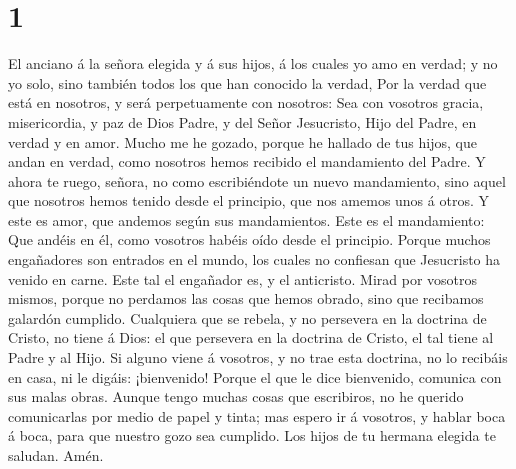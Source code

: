 \hypertarget{section}{%
\section{1}\label{section}}

 El anciano á la señora elegida y á sus hijos, á los
cuales yo amo en verdad; y no yo solo, sino también todos los que han
conocido la verdad,  Por la verdad que está en nosotros, y
será perpetuamente con nosotros:  Sea con vosotros gracia,
misericordia, y paz de Dios Padre, y del Señor Jesucristo, Hijo del
Padre, en verdad y en amor.  Mucho me he gozado, porque he
hallado de tus hijos, que andan en verdad, como nosotros hemos recibido
el mandamiento del Padre.  Y ahora te ruego, señora, no
como escribiéndote un nuevo mandamiento, sino aquel que nosotros hemos
tenido desde el principio, que nos amemos unos á otros.  Y
este es amor, que andemos según sus mandamientos. Este es el
mandamiento: Que andéis en él, como vosotros habéis oído desde el
principio.  Porque muchos engañadores son entrados en el
mundo, los cuales no confiesan que Jesucristo ha venido en carne. Este
tal el engañador es, y el anticristo.  Mirad por vosotros
mismos, porque no perdamos las cosas que hemos obrado, sino que
recibamos galardón cumplido.  Cualquiera que se rebela, y
no persevera en la doctrina de Cristo, no tiene á Dios: el que persevera
en la doctrina de Cristo, el tal tiene al Padre y al Hijo.
 Si alguno viene á vosotros, y no trae esta doctrina, no
lo recibáis en casa, ni le digáis: ¡bienvenido!  Porque
el que le dice bienvenido, comunica con sus malas obras. 
Aunque tengo muchas cosas que escribiros, no he querido comunicarlas por
medio de papel y tinta; mas espero ir á vosotros, y hablar boca á boca,
para que nuestro gozo sea cumplido.  Los hijos de tu
hermana elegida te saludan. Amén.
